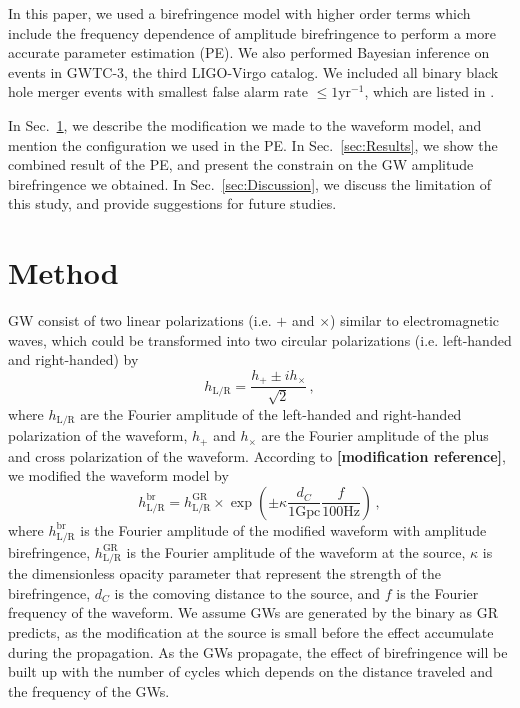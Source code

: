 \documentclass[reprint,amsmath,amssymb,aps,twocolumn]{aastex631}
\begin{document}
In this paper, we used a birefringence model with higher order terms which include the frequency dependence of amplitude birefringence
to perform a more accurate parameter estimation (PE).
We also performed Bayesian inference on events in GWTC-3, the third LIGO-Virgo catalog.
We included all binary black hole merger events with smallest false alarm rate $\leq1\mathrm{yr^{-1}}$, which are listed in \citet{GWTC_3_population}.

In Sec.~\ref{sec:Method}, we describe the modification we made to the waveform model, and mention the configuration we used in the PE.
In Sec.~\ref{sec:Results}, we show the combined result of the PE, and present the constrain on the GW amplitude birefringence we obtained.
In Sec.~\ref{sec:Discussion}, we discuss the limitation of this study, and provide suggestions for future studies.

\section{Method}
\label{sec:Method}

GW consist of two linear polarizations (i.e. $+$ and $\times$) similar to electromagnetic waves,
which could be transformed into two circular polarizations (i.e. left-handed and right-handed) by
\begin{equation}
    h_{\mathrm{L/R}} = \frac{h_+ \pm i h_\times}{\sqrt{2}}\,,
\end{equation}
where $h_{\mathrm{L/R}}$ are the Fourier amplitude of the left-handed and right-handed polarization of the waveform,
$h_+$ and $h_\times$ are the Fourier amplitude of the plus and cross polarization of the waveform.
According to \textbf{[modification reference]}, we modified the waveform model by
\begin{equation}
    h_\mathrm{L/R}^{\mathrm{br}}=
    h_\mathrm{L/R}^{\mathrm{GR}}\times
    \exp\left(\pm\kappa\frac{d_C}{1\mathrm{Gpc}}\frac{f}{100\mathrm{Hz}}\right)\,,
\end{equation}
where $h_\mathrm{L/R}^{\mathrm{br}}$ is the Fourier amplitude of the modified waveform with amplitude birefringence,
$h_\mathrm{L/R}^{\mathrm{GR}}$ is the Fourier amplitude of the waveform at the source,
$\kappa$ is the dimensionless opacity parameter that represent the strength of the birefringence,
$d_C$ is the comoving distance to the source, and $f$ is the Fourier frequency of the waveform.
We assume GWs are generated by the binary as GR predicts, as the modification at the source is small before the effect accumulate during the propagation.
As the GWs propagate, the effect of birefringence will be built up with the number of cycles which depends on the distance traveled and the frequency of the GWs.
\end{document}
